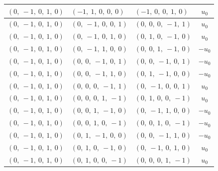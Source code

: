 \documentclass[11pt]{article}
\theoremstyle{definition}
\begin{document}
\begin{longtable}{|l|l|l|c|}
    \hline
    $\left( 0, \  -1, \  0, \  1, \  0\right)$ & $\left( -1, \  1, \  0, \  0, \  0\right)$ & $\left( -1, \  0, \  0, \  1, \  0\right)$ & $u_{0}$ \\
    \hline
    $\left( 0, \  -1, \  0, \  1, \  0\right)$ & $\left( 0, \  -1, \  0, \  0, \  1\right)$ & $\left( 0, \  0, \  0, \  -1, \  1\right)$ & $u_{0}$ \\
    \hline
    $\left( 0, \  -1, \  0, \  1, \  0\right)$ & $\left( 0, \  -1, \  0, \  1, \  0\right)$ & $\left( 0, \  1, \  0, \  -1, \  0\right)$ & $u_{0}$ \\
    \hline
    $\left( 0, \  -1, \  0, \  1, \  0\right)$ & $\left( 0, \  -1, \  1, \  0, \  0\right)$ & $\left( 0, \  0, \  1, \  -1, \  0\right)$ & $- u_{0}$ \\
    \hline
    $\left( 0, \  -1, \  0, \  1, \  0\right)$ & $\left( 0, \  0, \  -1, \  0, \  1\right)$ & $\left( 0, \  0, \  -1, \  0, \  1\right)$ & $- u_{0}$ \\
    \hline
    $\left( 0, \  -1, \  0, \  1, \  0\right)$ & $\left( 0, \  0, \  -1, \  1, \  0\right)$ & $\left( 0, \  1, \  -1, \  0, \  0\right)$ & $- u_{0}$ \\
    \hline
    $\left( 0, \  -1, \  0, \  1, \  0\right)$ & $\left( 0, \  0, \  0, \  -1, \  1\right)$ & $\left( 0, \  -1, \  0, \  0, \  1\right)$ & $u_{0}$ \\
    \hline
    $\left( 0, \  -1, \  0, \  1, \  0\right)$ & $\left( 0, \  0, \  0, \  1, \  -1\right)$ & $\left( 0, \  1, \  0, \  0, \  -1\right)$ & $u_{0}$ \\
    \hline
    $\left( 0, \  -1, \  0, \  1, \  0\right)$ & $\left( 0, \  0, \  1, \  -1, \  0\right)$ & $\left( 0, \  -1, \  1, \  0, \  0\right)$ & $- u_{0}$ \\
    \hline
    $\left( 0, \  -1, \  0, \  1, \  0\right)$ & $\left( 0, \  0, \  1, \  0, \  -1\right)$ & $\left( 0, \  0, \  1, \  0, \  -1\right)$ & $- u_{0}$ \\
    \hline
    $\left( 0, \  -1, \  0, \  1, \  0\right)$ & $\left( 0, \  1, \  -1, \  0, \  0\right)$ & $\left( 0, \  0, \  -1, \  1, \  0\right)$ & $- u_{0}$ \\
    \hline
    $\left( 0, \  -1, \  0, \  1, \  0\right)$ & $\left( 0, \  1, \  0, \  -1, \  0\right)$ & $\left( 0, \  -1, \  0, \  1, \  0\right)$ & $u_{0}$ \\
    \hline
    $\left( 0, \  -1, \  0, \  1, \  0\right)$ & $\left( 0, \  1, \  0, \  0, \  -1\right)$ & $\left( 0, \  0, \  0, \  1, \  -1\right)$ & $u_{0}$ \\

\end{longtable}
\end{document}
